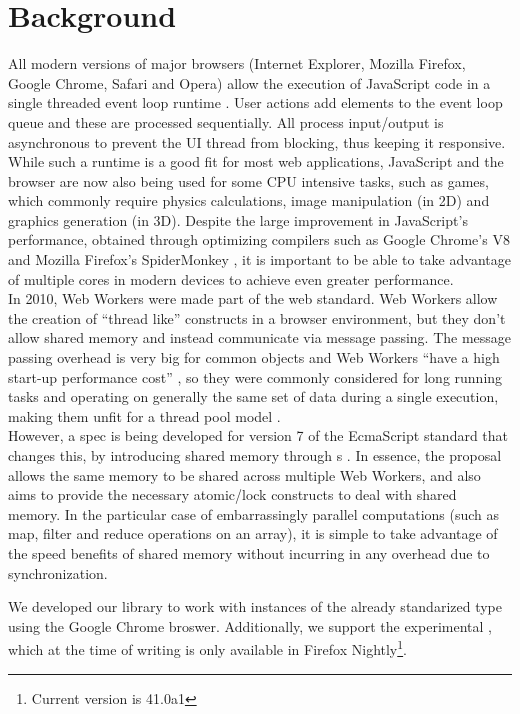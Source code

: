 \section{Background}\label{sec:background}
All modern versions of major browsers (Internet Explorer, Mozilla Firefox, Google Chrome, Safari and Opera) allow the execution of JavaScript code in a single threaded event loop runtime \cite{event-loop}. User actions add elements to the event loop queue and these are processed sequentially. All process input/output is asynchronous to prevent the UI thread from blocking, thus keeping it responsive.
While such a runtime is a good fit for most web applications, JavaScript and the browser are now also being used for some CPU intensive tasks, such as games, which commonly require physics calculations, image manipulation (in 2D) and graphics generation (in 3D). Despite the large improvement in JavaScript's performance, obtained through optimizing compilers such as Google Chrome's V8 \cite{v8} and Mozilla Firefox's SpiderMonkey \cite{spider-monkey}, it is important to be able to take advantage of multiple cores in modern devices to achieve even greater performance.\\
In 2010, Web Workers were made part of the web standard. Web Workers allow the creation of ``thread like'' constructs in a browser environment, but they don't allow shared memory and instead communicate via message passing. The message passing overhead is very big for common objects and Web Workers ``have a high start-up performance cost'' \cite{w3c-ww-startup}, so they were commonly considered for long running tasks and operating on generally the same set of data during a single execution, making them unfit for a thread pool  model \cite{thread-pool}.\\
However, a spec is being developed for version 7 of the EcmaScript standard that changes this, by introducing shared memory through \tsabuffer{}s \cite{sab}. In essence, the proposal allows the same memory to be shared across multiple Web Workers, and also aims to provide the necessary atomic/lock constructs to deal with shared memory. In the particular case of embarrassingly parallel computations (such as map, filter and reduce operations on an array), it is simple to take advantage of the speed benefits of shared memory without incurring in any overhead due to synchronization.

We developed our library to work with instances of the already standarized \tabuffer{} type using the Google Chrome broswer. Additionally, we support the experimental \tsabuffer{}, which at the time of writing is only available in Firefox Nightly\footnote{Current version is 41.0a1}.

\pagebreak